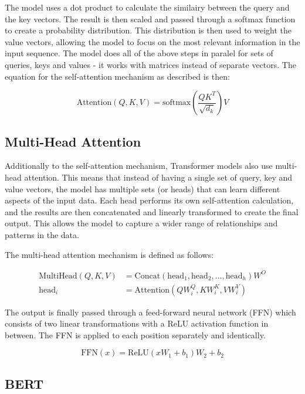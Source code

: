\documentclass[twoside]{ctuthesis}
\theoremstyle{plain}
\theoremstyle{definition}
\theoremstyle{note}
\begin{document}
The model uses a dot product to calculate the similairy between the query and the key vectors. The result is then scaled and passed through a softmax function to create a probability distribution. This distribution is then used to weight the value vectors, allowing the model to focus on the most relevant information in the input sequence. The model does all of the above steps in paralel for sets of queries, keys and values - it works with matrices instead of separate vectors. The equation for the self-attention mechanism as described is then: \par

\begin{equation}
	\text{Attention}(Q, K, V) = \text{softmax}\left(\frac{QK^T}{\sqrt{d_k}}\right)V
\end{equation}


\subsection{Multi-Head Attention}

Additionally to the self-attention mechanism, Transformer models also use multi-head attention. This means that instead of having a single set of query, key and value vectors, the model has multiple sets (or heads) that can learn different aspects of the input data. Each head performs its own self-attention calculation, and the results are then concatenated and linearly transformed to create the final output. This allows the model to capture a wider range of relationships and patterns in the data.\par
The multi-head attention mechanism is defined as follows:

\begin{align}
	\text{MultiHead}(Q, K, V) &= \text{Concat}(\text{head}_1, \text{head}_2, \ldots, \text{head}_h)W^O \\
	\text{head}_i &= \text{Attention}(QW_i^Q, KW_i^K, VW_i^V)
\end{align}

The output is finally passed through a feed-forward neural network (FFN) which consists of two linear transformations with a ReLU activation function in between. The FFN is applied to each position separately and identically.

\begin{equation}
	\text{FFN}(x) = \text{ReLU}(xW_1 + b_1)W_2 + b_2 
\end{equation}

\subsection{BERT}
\end{document}

